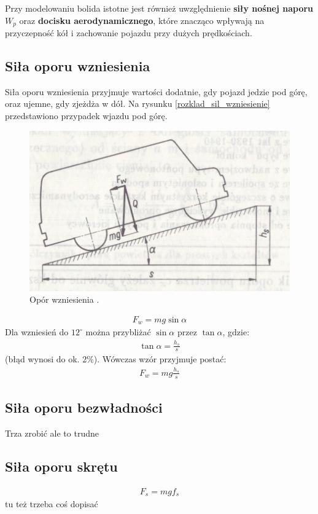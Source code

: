 \documentclass{article}
\begin{document}
	Przy modelowaniu bolida istotne jest również uwzględnienie \textbf{siły nośnej naporu} $W_p$ oraz \textbf{docisku aerodynamicznego}, które znacząco wpływają na przyczepność kół i zachowanie pojazdu przy dużych prędkościach.
	\subsection{Siła oporu wzniesienia}
	Siła oporu wzniesienia przyjmuje wartości dodatnie, gdy pojazd jedzie pod górę, oraz ujemne, gdy zjeżdża w dół. Na rysunku \ref{rozklad_sil_wzniesienie} przedstawiono przypadek wjazdu pod górę.
	\begin{figure}[h!]
		\centering
		\includegraphics{rozklad_sil_wzniesienie.jpg}
		\caption{Opór wzniesienia \cite{Arczynski}.}
		\label{fig:rozklad_sil_wzniesienie}
	\end{figure}
	\begin{align}
		F_w=mg\sin \alpha
	\end{align}
	Dla wzniesień do $12^{\circ}$ można przybliżać $\sin \alpha$ przez $\tan \alpha$, gdzie:
	\begin{align}
		\tan \alpha = \frac{h_s}{s}
	\end{align}
	(błąd wynosi do ok. 2\%). Wówczas wzór przyjmuje postać:
	\begin{align}
		F_w=mg\frac{h_s}{s}
	\end{align}
	
	\subsection{Siła oporu bezwładności}
	Trza zrobić ale to trudne
	\subsection{Siła oporu skrętu}
	\begin{align}
		F_s=mgf_s
	\end{align}
	tu też trzeba coś dopisać
	
	 
\end{document}
